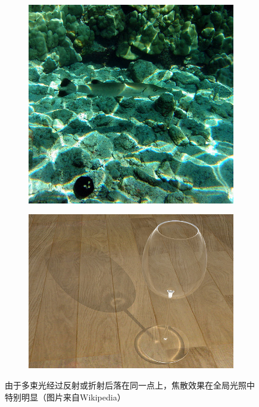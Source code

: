 \begin{figure}
\begin{fullwidth}
\begin{subfigure}[b]{0.19\thewidth}
		\includegraphics[width=1.\textwidth]{figures/intro/Caustics-3}
	\end{subfigure}	
	\begin{subfigure}[b]{0.246\thewidth}
		\includegraphics[width=1.\textwidth]{figures/intro/Caustics-4}
	\end{subfigure}
\caption{由于多束光经过反射或折射后落在同一点上，焦散效果在全局光照中特别明显（图片来自Wikipedia）}
\label{f:intro-caustics}
\end{fullwidth}
\end{figure}

